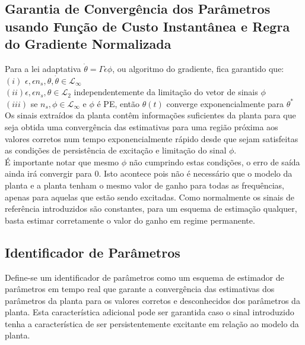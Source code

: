 \documentclass[
	12pt,				%
	openright,			%
	twoside,			%
	a4paper,			%
	english,			%
	french,				%
	spanish,			%
	brazil				%
	]{abntex2}
\begin{document}
 
 
\subsection{Garantia de Convergência dos Parâmetros usando Função de Custo Instantânea e Regra do Gradiente Normalizada} 
 
 Para a lei adaptativa $\dot{\theta} = \Gamma \epsilon \phi$, ou algoritmo do gradiente, fica garantido que:\\
 
 \noindent $(i)$ $\epsilon,\epsilon n_s, \theta, \dot{\theta} \in \mathcal{L}_{\infty}$\\
 $(ii) \epsilon,\epsilon n_s, \theta \in \mathcal{L}_{2} $ independentemente da limitação do vetor de sinais $\phi$\\
 $(iii)$ se $n_s,\phi \in \mathcal{L}_{\infty}$ e $\phi$ é PE, então $\theta(t)$ converge exponencialmente para $\theta^*$\\
 
 Os sinais extraídos da planta contêm informações suficientes da planta para que seja obtida uma convergência das estimativas para uma região próxima aos valores corretos num tempo exponencialmente rápido desde que sejam satisfeitas as condições de persistência de excitação e limitação do sinal $\phi$\cite[p.~184-186]{ioannou2}.\\
 
 É importante notar que mesmo $\phi$ não cumprindo estas condições, o erro de saída ainda irá convergir para 0. Isto acontece pois não é necessário que o modelo da planta e a planta tenham o mesmo valor de ganho para todas as frequências, apenas para aquelas que estão sendo excitadas. Como normalmente os sinais de referência introduzidos são constantes, para um esquema de estimação qualquer, basta estimar corretamente o valor do ganho em regime permanente. \\

\subsection{Identificador de Parâmetros}

 Define-se um identificador de parâmetros como um esquema de estimador de parâmetros em tempo real que garante a convergência das estimativas dos parâmetros da planta para os valores corretos e desconhecidos dos parâmetros da planta. Esta característica adicional pode ser garantida caso o sinal introduzido tenha a característica de ser persistentemente excitante em relação ao modelo da planta\cite[p.~250-251]{ioannou2}.\\
 
\end{document}
